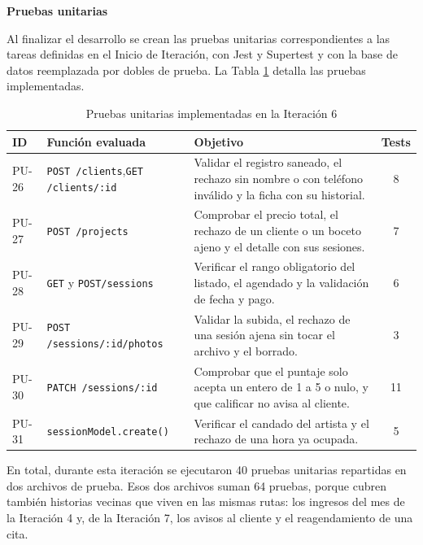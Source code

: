 \documentclass[12pt,letterpaper,oneside]{report}
\newcommand{\titulopar}[1]{\par\textbf{#1}\par}
\begin{document}
\vspace{\parskip}
\titulopar{Pruebas unitarias}
Al finalizar el desarrollo se crean las pruebas unitarias correspondientes a las tareas definidas en el Inicio de Iteración, con Jest y Supertest y con la base de datos reemplazada por dobles de prueba. La Tabla \ref{tab:pruebas6} detalla las pruebas implementadas.

\begin{table}[H]
  \centering
  \caption{Pruebas unitarias implementadas en la Iteración 6}
  \label{tab:pruebas6}
  \renewcommand{\arraystretch}{1.2}
  \begin{tabular}{|l|p{3.4cm}|p{6.6cm}|c|}
    \hline
    \textbf{ID} & \textbf{Función evaluada} & \textbf{Objetivo} & \textbf{Tests} \\
    \hline
    PU-26 & \texttt{POST /clients},\newline \texttt{GET /clients/:id} & Validar el registro saneado, el rechazo sin nombre o con teléfono inválido y la ficha con su historial. & 8 \\ \hline
    PU-27 & \texttt{POST /projects} & Comprobar el precio total, el rechazo de un cliente o un boceto ajeno y el detalle con sus sesiones. & 7 \\ \hline
    PU-28 & \texttt{GET} y \texttt{POST\newline /sessions} & Verificar el rango obligatorio del listado, el agendado y la validación de fecha y pago. & 6 \\ \hline
    PU-29 & \texttt{POST /sessions/\newline :id/photos} & Validar la subida, el rechazo de una sesión ajena sin tocar el archivo y el borrado. & 3 \\ \hline
    PU-30 & \texttt{PATCH /sessions/:id} & Comprobar que el puntaje solo acepta un entero de 1 a 5 o nulo, y que calificar no avisa al cliente. & 11 \\ \hline
    PU-31 & \texttt{sessionModel.\newline create()} & Verificar el candado del artista y el rechazo de una hora ya ocupada. & 5 \\ \hline
  \end{tabular}
\end{table}

En total, durante esta iteración se ejecutaron 40 pruebas unitarias repartidas en dos archivos de prueba. Esos dos archivos suman 64 pruebas, porque cubren también historias vecinas que viven en las mismas rutas: los ingresos del mes de la Iteración 4 y, de la Iteración 7, los avisos al cliente y el reagendamiento de una cita.
\end{document}
